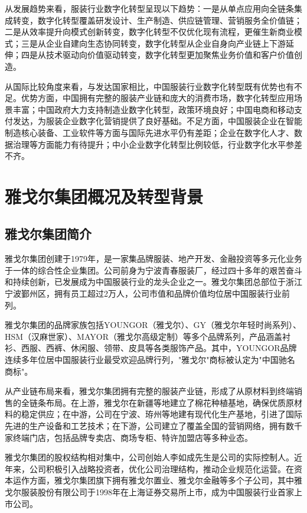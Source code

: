 \documentclass[12pt,a4paper]{article}
\begin{document}
从发展趋势来看，服装行业数字化转型呈现以下趋势：一是从单点应用向全链条集成转变，数字化转型覆盖研发设计、生产制造、供应链管理、营销服务全价值链；二是从效率提升向模式创新转变，数字化转型不仅优化现有流程，更催生新商业模式；三是从企业自建向生态协同转变，数字化转型从企业自身向产业链上下游延伸；四是从技术驱动向价值驱动转变，数字化转型更加聚焦业务价值和客户价值创造。

从国际比较角度来看，与发达国家相比，中国服装行业数字化转型既有优势也有不足。优势方面，中国拥有完整的服装产业链和庞大的消费市场，数字化转型应用场景丰富；中国政府大力支持制造业数字化转型，政策环境良好；中国电商和移动支付发达，为服装企业数字化营销提供了良好基础。不足方面，中国服装企业在智能制造核心装备、工业软件等方面与国际先进水平仍有差距；企业在数字化人才、数据治理等方面能力有待提升；中小企业数字化转型比例较低，行业数字化水平参差不齐。

\newpage

\section{雅戈尔集团概况及转型背景}

\subsection{雅戈尔集团简介}

雅戈尔集团创建于1979年，是一家集品牌服装、地产开发、金融投资等多元化业务于一体的综合性企业集团。公司前身为宁波青春服装厂，经过四十多年的艰苦奋斗和持续创新，已发展成为中国服装行业的龙头企业之一。雅戈尔集团总部位于浙江宁波鄞州区，拥有员工超过2万人，公司市值和品牌价值均位居中国服装行业前列。

雅戈尔集团的品牌家族包括YOUNGOR（雅戈尔）、GY（雅戈尔年轻时尚系列）、HSM（汉麻世家）、MAYOR（雅戈尔高级定制）等多个品牌系列，产品涵盖衬衫、西服、西裤、休闲服、领带、皮具等各类服饰产品。其中，YOUNGOR品牌连续多年位居中国服装行业最受欢迎品牌行列，"雅戈尔"商标被认定为"中国驰名商标"。

从产业链布局来看，雅戈尔集团拥有完整的服装产业链，形成了从原材料到终端销售的全链条布局。在上游，雅戈尔在新疆等地建立了棉花种植基地，确保优质原材料的稳定供应；在中游，公司在宁波、珔州等地建有现代化生产基地，引进了国际先进的生产设备和工艺技术；在下游，公司建立了覆盖全国的营销网络，拥有数千家终端门店，包括品牌专卖店、商场专柜、特许加盟店等多种业态。

雅戈尔集团的股权结构相对集中，公司创始人李如成先生是公司的实际控制人。近年来，公司积极引入战略投资者，优化公司治理结构，推动企业规范化运营。在资本运作方面，雅戈尔集团旗下拥有雅戈尔置业、雅戈尔金融等多个子公司，其中雅戈尔服装股份有限公司于1998年在上海证券交易所上市，成为中国服装行业首家上市公司。
\end{document}
